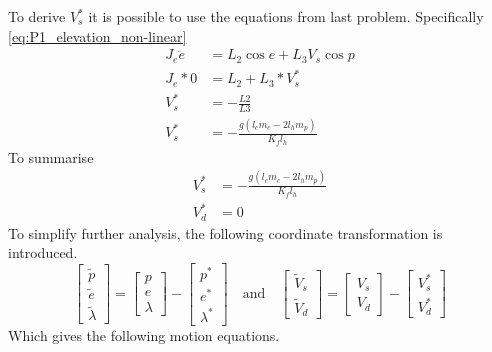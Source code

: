 To derive $V_s^*$ it is possible to use the equations from last problem. Specifically \ref{eq:P1_elevation_non-linear}
\begin{align*}
     J_e \ddot{e} &= L_2 \cos{e} + L_3 V_s \cos{p} \\
     J_e * 0 &= L_2 + L_3 * V_s^* \\
     V_s^* &= -\frac{L2}{L3} \\
     V_s^* &= -\frac{g(l_c m_c - 2 l_h m_p)}{K_f l_h}
\end{align*}
To summarise
\begin{subequations}
    \begin{align}
        V_s^* &= -\frac{g(l_c m_c - 2 l_h m_p)}{K_f l_h} \label{eq:P1p2_Vs} \\
        V_d^* &= 0 \label{eq:P1p2_Vd}
    \end{align}    
\end{subequations}
To simplify further analysis, the following coordinate transformation is introduced.
\begin{equation}
    \begin{bmatrix}
        \tilde{p} \\ \tilde{e} \\ \tilde{\lambda}
    \end{bmatrix}
    =
    \begin{bmatrix}
        p \\ e \\ \lambda
    \end{bmatrix}
    -
    \begin{bmatrix}
        p^* \\ e^* \\ \lambda^*
    \end{bmatrix}
    \quad \text{and} \quad
    \begin{bmatrix}
        \tilde{V}_s \\ \tilde{V}_d
    \end{bmatrix}
    =
    \begin{bmatrix}
        V_s \\ V_d
    \end{bmatrix}
    -
    \begin{bmatrix}
        V_s^* \\ V_d^*
    \end{bmatrix}
\end{equation}
Which gives the following motion equations.
